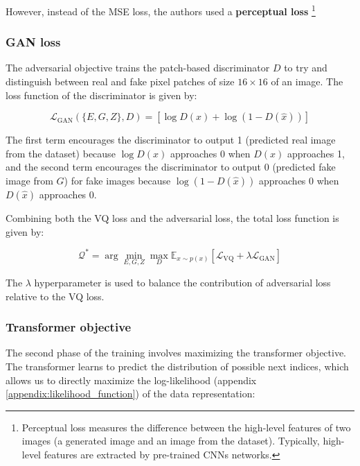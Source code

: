 However, instead of the MSE loss, the authors used a \textbf{perceptual loss} \cite{perceptual_loss} \footnote[4]{Perceptual loss measures the difference between the high-level features of two images (a generated image and an image from the dataset). Typically, high-level features are extracted by pre-trained CNNs networks.}







\subsubsection*{GAN loss}

The adversarial objective trains the patch-based discriminator $D$ to try and distinguish between real and fake pixel patches of size $16\times 16$ of an image. The loss function of the discriminator is given by:

\begin{equation*}
    \mathcal{L}_{\text{GAN}}(\{E,G,Z\}, D) = [\log D(x) + \log (1-D(\hat{x}))]
\end{equation*}

The first term encourages the discriminator to output 1 (predicted real image from the dataset) because $\log D(x)$ approaches 0 when $D(x)$ approaches 1, and the second term encourages the discriminator to output 0 (predicted fake image from $G$) for fake images because $\log (1-D(\hat{x}))$ approaches 0 when $D(\hat{x})$ approaches 0.

Combining both the VQ loss and the adversarial loss, the total loss function is given by:

\begin{equation*}
    \mathcal{Q^*} = \arg \min_{E, G, Z} \max_D \mathbb{E}_{x \sim p(x)} [\mathcal{L}_{\text{VQ}} + \lambda \mathcal{L}_{\text{GAN}}]
\end{equation*}

The $\lambda$ hyperparameter is used to balance the contribution of adversarial loss relative to the VQ loss.






\subsubsection*{Transformer objective}

The second phase of the training involves maximizing the transformer objective. The transformer learns to predict the distribution of possible next indices, which allows us to directly maximize the log-likelihood (appendix \ref{appendix:likelihood_function}) of the data representation:

